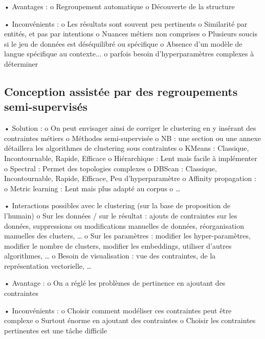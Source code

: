             •	Avantages :
                o	Regroupement automatique
                o	Découverte de la structure

            •	Inconvénients :
                o	Les résultats sont souvent peu pertinents
                o	Similarité par entités, et pas par intentions
                o	Nuances métiers non comprises
                o	Plusieurs soucis si le jeu de données est déséquilibré ou spécifique
                o	Absence d’un modèle de langue spécifique au contexte...
                o   parfois besoin d'hyperparamètres complexes à déterminer

        \subsection{Conception assistée par des regroupements semi-supervisés}

            •	Solution :
                o	On peut envisager ainsi de corriger le clustering en y insérant des contraintes métiers\hspace{2em}
                \cite{lampert-etal:2018:constrained-distance-based}
                o	Méthodes semi-supervisée
                o	NB : une section ou une annexe détaillera les algorithmes de clustering sous contraintes
					o	KMeans : Classique, Incontournable, Rapide, Efficace
					o	Hiérarchique : Lent mais facile à implémenter
					o	Spectral : Permet des topologies complexes
					o	DBScan : Classique, Incontournable, Rapide, Efficace, Peu d'hyperparamètre
					o	Affinity propagation : 
					o	Metric learning : Lent mais plus adapté au corpus
					o	…

            •   Interactions possibles avec le clustering (sur la base de proposition de l'humain)
                o	Sur les données / sur le résultat : ajouts de contraintes sur les données, suppressions ou modifications manuelles de données, réorganisation manuelles des clusters, …
                o	Sur les paramètres : modifier les hyper-paramètres, modifier le nombre de clusters, modifier les embeddings, utiliser d’autres algorithmes, …
                o	Besoin de visualisation : vue des contraintes, de la représentation vectorielle, …

            •	Avantage :
                o	On a réglé les problèmes de pertinence en ajoutant des contraintes

            •	Inconvénients : 
                o	Choisir comment modéliser ces contraintes peut être complexe
                o	Surtout énorme en ajoutant des contraintes
                o	Choisir les contraintes pertinentes est une tâche difficile


